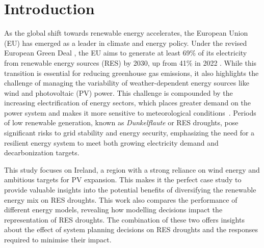 \documentclass[a4paper, 11pt]{article}
\begin{document}
\section{Introduction}
\label{sec:Intro}

As the global shift towards renewable energy accelerates, the European Union (EU) has emerged as a leader in climate and energy policy. Under the revised European Green Deal \cite{greendeal2022report}, the EU aims to generate at least 69\% of its electricity from renewable energy sources (RES) by 2030, up from 41\% in 2022 \cite{eurostat2023share}. While this transition is essential for reducing greenhouse gas emissions, it also highlights the challenge of managing the variability of weather-dependent energy sources like wind and photovoltaic (PV) power. This challenge is compounded by the increasing electrification of energy sectors, which places greater demand on the power system and makes it more sensitive to meteorological conditions~\cite{bloomfield2021, bloomfield2016, vanderWiel2019drought}. Periods of low renewable generation, known as \textit{Dunkelflaute} or RES droughts, pose significant risks to grid stability and energy security, emphasizing the need for a resilient energy system to meet both growing electricity demand and decarbonization targets.

This study focuses on Ireland, a region with a strong reliance on wind energy and ambitious targets for PV expansion. This makes it the perfect case study to provide valuable insights into the potential benefits of diversifying the renewable energy mix on RES droughts. This work also compares the performance of different energy models, revealing how modelling decisions impact the representation of RES droughts. The combination of these two offers insights about the effect of system planning decisions on RES droughts and the responses required to minimise their impact.

\end{document}
